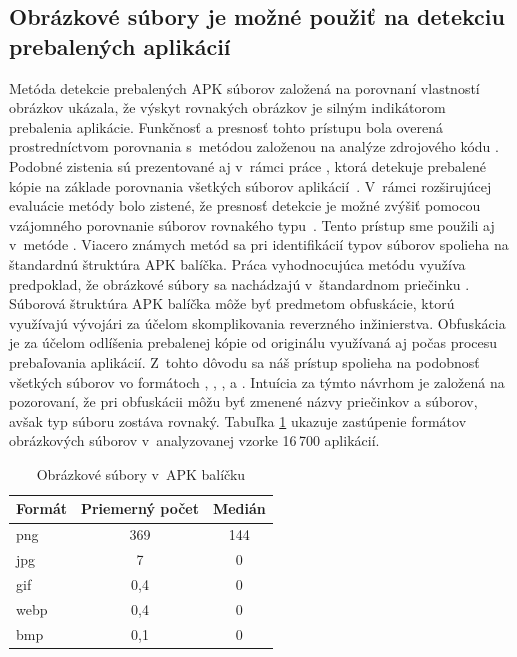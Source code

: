 \subsection*{Obrázkové súbory je možné použiť na detekciu prebalených aplikácií}
Metóda detekcie prebalených APK súborov  založená na porovnaní vlastností obrázkov ukázala, že výskyt rovnakých obrázkov je silným indikátorom prebalenia aplikácie. Funkčnosť a presnosť tohto prístupu bola overená prostredníctvom porovnania s~metódou založenou na analýze zdrojového kódu \cite{ImageStruct}. Podobné zistenia sú prezentované aj v~rámci práce , ktorá detekuje prebalené kópie na základe porovnania všetkých súborov aplikácií~\cite{Zhauniarovich2014}. V~rámci rozširujúcej evaluácie metódy  bolo zistené, že presnosť detekcie je možné zvýšiť pomocou vzájomného porovnanie súborov rovnakého typu~\cite{Gadyatskaya2016}. Tento prístup sme použili aj v~metóde . Viacero známych metód sa pri identifikácií typov súborov spolieha na štandardnú štruktúra APK balíčka. Práca vyhodnocujúca metódu  využíva predpoklad, že obrázkové súbory sa nachádzajú v~štandardnom priečinku . Súborová štruktúra APK balíčka môže byť predmetom obfuskácie, ktorú využívajú vývojári za účelom skomplikovania reverzného inžinierstva. Obfuskácia je za účelom odlíšenia prebalenej kópie od originálu využívaná aj počas procesu prebaľovania aplikácií. Z~tohto dôvodu sa náš prístup spolieha na podobnosť všetkých súborov vo formátoch , , ,  a . Intuícia za týmto návrhom je založená na pozorovaní, že pri obfuskácii môžu byť zmenené názvy priečinkov a súborov, avšak typ súboru zostáva rovnaký. Tabuľka \ref{images-apk} ukazuje zastúpenie formátov obrázkových súborov v~analyzovanej vzorke 16\,700 aplikácií.
\begin{table}[]
\centering
\begin{tabular}{|l|c|c|}
\hline
\textbf{Formát} & \textbf{Priemerný počet}  & \textbf{Medián}         \\ \hline
png             & 369                       & 144         \\
jpg             & 7                         & 0                 \\
gif             & 0,4                       & 0             \\
webp            & 0,4                       & 0         \\
bmp             & 0,1                       & 0         \\
\hline
\end{tabular}
\caption{Obrázkové súbory v~APK balíčku}
\label{images-apk}
\end{table}

